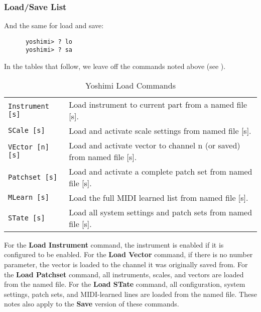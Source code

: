 %

\subsubsection{Load/Save List}
\label{subsec:command_line_loadsave_list}

   And the same for load and save:

   \begin{verbatim}
      yoshimi> ? lo
      yoshimi> ? sa
   \end{verbatim}

   In the tables that follow, we leave off the commands noted above
   (see ).

   \begin{table}[H]
      \centering
      \caption{Yoshimi Load Commands}
      \label{table:yoshimi_text_load_commands}
      \begin{tabular}{l l}

\texttt{Instrument [s]} &
   Load instrument to current part from a named file [s]. \\
\texttt{SCale [s]} &
   Load and activate scale settings from named file [s]. \\
\texttt{VEctor [n] [s]} &
   Load and activate vector to channel n (or saved) from named file [s]. \\
\texttt{Patchset [s]} &
   Load and activate a complete patch set from named file [s]. \\
\texttt{MLearn [s]} &
   Load the full MIDI learned list from named file [s]. \\
\texttt{STate [s]} &
   Load all system settings and patch sets from named file [s]. \\

      \end{tabular}
   \end{table}

   For the \textbf{Load Instrument} command, the instrument is enabled if it is
   configured to be enabled.  For the \textbf{Load Vector} command, if there is
   no number parameter, the vector is loaded to the channel it was originally
   saved from.
   For the \textbf{Load Patchset} command, all instruments, scales, and vectors
   are loaded from the named file.
   For the \textbf{Load STate} command, all configuration, system settings,
   patch sets, and MIDI-learned lines are loaded from the named file.
   These notes also apply to the \textbf{Save} version of these commands.

